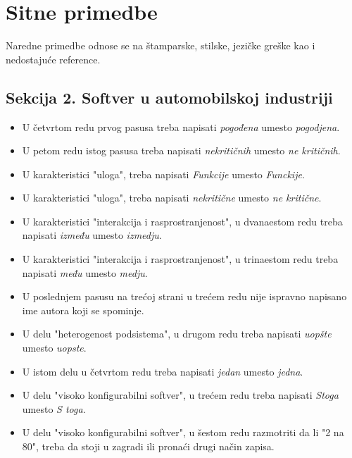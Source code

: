 \documentclass[a4paper]{report}
\begin{document}
\section{Sitne primedbe}
Naredne primedbe odnose se na štamparske, stilske, jezičke greške kao i nedostajuće reference. 

\subsection{Sekcija 2. Softver u automobilskoj industriji}

\begin{itemize}
\item U četvrtom redu prvog pasusa treba napisati \textit{pogođena}  umesto \textit{pogodjena}.

\item U petom redu istog pasusa treba napisati \textit{nekritičnih} umesto \textit{ne kritičnih}.

\item U karakteristici "uloga", treba napisati \textit{Funkcije} umesto \textit{Funckije}.

\item U karakteristici "uloga", treba napisati \textit{nekritične} umesto \textit{ne kritične}.

\item U karakteristici "interakcija i rasprostranjenost", u dvanaestom redu treba napisati  \textit{između} umesto \textit{izmedju}.

\item U karakteristici "interakcija i rasprostranjenost", u trinaestom redu treba napisati \textit{među} umesto \textit{medju}.

\item U poslednjem pasusu na trećoj strani u trećem redu nije ispravno napisano ime autora koji se spominje. 

\item U delu "heterogenost podsistema", u drugom redu treba napisati \textit{uopšte} umesto \textit{uopste}.

\item U istom delu u četvrtom redu treba napisati \textit{jedan} umesto \textit{jedna}.

\item U delu "visoko konfigurabilni softver", u trećem redu treba napisati \textit{Stoga} umesto \textit{S toga}.

\item U delu "visoko konfigurabilni softver", u šestom redu razmotriti da li "2 na 80", treba da stoji u zagradi ili pronaći drugi način zapisa.

\end{itemize}
\end{document}
